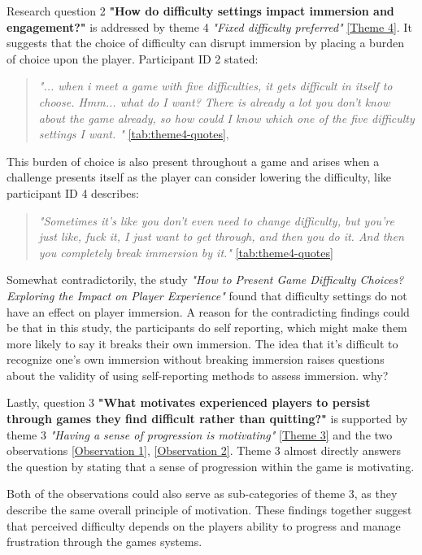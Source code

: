 Research question 2 \textbf{"How do difficulty settings impact immersion and engagement?"} is addressed by theme 4 \textit{"Fixed difficulty preferred"} \ref{Theme 4}. It suggests that the choice of difficulty can disrupt immersion by placing a burden of choice upon the player. Participant ID 2 stated:
\begin{quote}
    \textit{"... when i meet a game with five difficulties, it gets difficult in itself to choose. Hmm... what do I want? There is already a lot you don't know about the game already, so how could I know which one of the five difficulty settings I want. "} \ref{tab:theme4-quotes},
\end{quote}
This burden of choice is also present throughout a game and arises when a challenge presents itself as the player can consider lowering the difficulty, like participant ID 4 describes:
\begin{quote}
    \textit{"Sometimes it's like you don't even need to change difficulty, but you're just like, fuck it, I just want to get through, and then you do it. And then you completely break immersion by it."} \ref{tab:theme4-quotes}
\end{quote}
Somewhat contradictorily, the study \textit{"How to Present Game Difficulty Choices? Exploring the Impact on Player Experience"} \cite{jan_d_smeddinck_how_2016} found that difficulty settings do not have an effect on player immersion. A reason for the contradicting findings could be that in this study, the participants do self reporting, which might make them more likely to say it breaks their own immersion. The idea that it's difficult to recognize one's own immersion without breaking immersion raises questions about the validity of using self-reporting methods to assess immersion. why?

Lastly, question 3 \textbf{"What motivates experienced players to persist through games they find difficult rather than quitting?"} is supported by theme 3 \textit{"Having a sense of progression is motivating"} \ref{Theme 3} and the two observations \ref{Observation 1}, \ref{Observation 2}. Theme 3 almost directly answers the question by stating that a sense of progression within the game is motivating.

Both of the observations could also serve as sub-categories of theme 3, as they describe the same overall principle of motivation. These findings together suggest that perceived difficulty depends on the players ability to progress and manage frustration through the games systems. 

